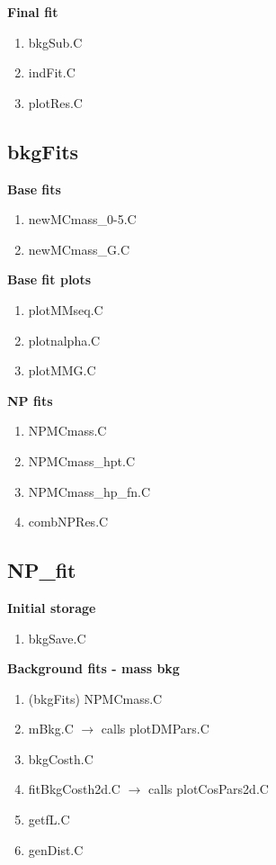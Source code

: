 \documentclass{article}
\begin{document}
\textbf{Final fit}
\begin{enumerate}
\item bkgSub.C
\item indFit.C
\item plotRes.C
\end{enumerate}

\pagebreak

\subsection{bkgFits}

\textbf{Base fits}
\begin{enumerate}
\item newMCmass\_0-5.C
\item newMCmass\_G.C
\end{enumerate}

\textbf{Base fit plots}
\begin{enumerate}
\item plotMMseq.C
\item plotnalpha.C
\item plotMMG.C
\end{enumerate}

\textbf{NP fits}
\begin{enumerate}
\item NPMCmass.C
\item NPMCmass\_hpt.C
\item NPMCmass\_hp\_fn.C
\item combNPRes.C
\end{enumerate}

\subsection{NP\_fit}

\textbf{Initial storage}
\begin{enumerate}
\item bkgSave.C
\end{enumerate}

\textbf{Background fits - mass bkg}
\begin{enumerate}
\item (bkgFits) NPMCmass.C
\item mBkg.C $\rightarrow$ calls plotDMPars.C
\item bkgCosth.C
\item fitBkgCosth2d.C $\rightarrow$ calls plotCosPars2d.C
\item getfL.C
\item genDist.C
\end{enumerate}
\end{document}
